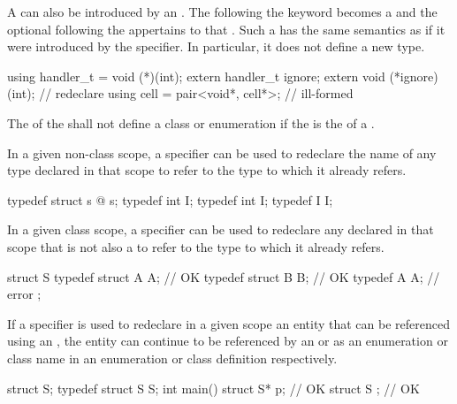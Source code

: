 \pnum
A  can also be introduced by an
. The  following the
 keyword becomes a 
and the optional  following the
 appertains to that .
Such a  has the same
semantics as if it were introduced by the  specifier. In
particular, it does not define a new type.
\begin{example}
\begin{codeblock}
using handler_t = void (*)(int);
extern handler_t ignore;
extern void (*ignore)(int);         // redeclare 
using cell = pair<void*, cell*>;    // ill-formed
\end{codeblock}
\end{example}
The 
of the  shall not define
a class or enumeration if the 
is the  of a .

\pnum
{}%
In a given non-class scope, a  specifier can be used to
redeclare the name of any type declared in that scope to refer to the
type to which it already refers.
\begin{example}
\begin{codeblock}
typedef struct s { @\commentellip@ } s;
typedef int I;
typedef int I;
typedef I I;
\end{codeblock}
\end{example}

\pnum
In a given class scope, a  specifier can be used to
redeclare any  declared in that scope that is not
also a  to refer to the type to which it already
refers.
\begin{example}
\begin{codeblock}
struct S {
  typedef struct A { } A;       // OK
  typedef struct B B;           // OK
  typedef A A;                  // error
};
\end{codeblock}
\end{example}

\pnum
If a  specifier is used to redeclare in a given scope an
entity that can be referenced using an ,
the entity can continue to be referenced by an
 or as an enumeration or class name
in an enumeration or class definition respectively.
\begin{example}
\begin{codeblock}
struct S;
typedef struct S S;
int main() {
  struct S* p;                  // OK
}
struct S { };                   // OK
\end{codeblock}
\end{example}

